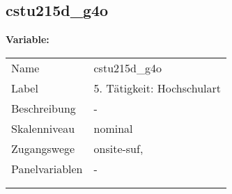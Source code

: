 	
	
	\subsection{cstu215d\_g4o}
	\label{subSection:cstu215d_g4o}

	\noindent\textbf{Variable:}\\
		\begin{tabular}{lL{11.3cm}}
			\label{tableVariable:cstu215d_g4o}
			Name & cstu215d\_g4o \\
			Label & 5. Tätigkeit: Hochschulart \\
			Beschreibung & - \\
			Skalenniveau & nominal \\
			Zugangswege &
				onsite-suf,
 \\
			Panelvariablen & -
			 \\
			 \\
 \\
		\end{tabular}






